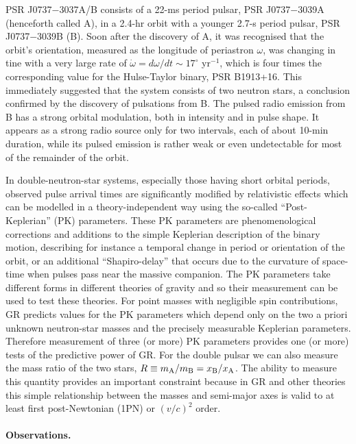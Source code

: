 \documentclass[12pt,psfig]{article}
\begin{document}
PSR J0737$-$3037A/B consists of a 22-ms period pulsar, PSR J0737$-$3039A
(henceforth called A), in a 2.4-hr orbit with a younger 2.7-s period pulsar,
PSR J0737$-$3039B (B).  Soon after the discovery of A\cite{bdp+03}, it was
recognised that the orbit's orientation, measured as the longitude of
periastron $\omega$, was changing in tine with a very large rate of
$\dot{\omega} =d\omega/dt \sim 17^\circ$ yr$^{-1}$, which is four times the
corresponding value for the Hulse-Taylor binary, PSR B1913+16\cite{tw89}. This
immediately suggested that the system consists of two neutron stars, a
conclusion confirmed by the discovery of pulsations from B\cite{lbk+04}. The
pulsed radio emission from B has a strong orbital modulation, both in
intensity and in pulse shape. It appears as a strong radio source only for two
intervals, each of about 10-min duration, while its pulsed emission is rather
weak or even undetectable for most of the remainder of the
orbit\cite{lbk+04,bpm+05}.


In double-neutron-star systems, especially those having short orbital periods,
observed pulse arrival times are significantly modified by relativistic
effects which can be modelled in a theory-independent way using the so-called
``Post-Keplerian'' (PK) parameters\cite{dd86}.  These PK parameters are
phenomenological corrections and additions to the simple Keplerian description
of the binary motion, describing for instance a temporal change in period or
orientation of the orbit, or an additional ``Shapiro-delay'' that occurs due
to the curvature of space-time when pulses pass near the massive companion.
The PK parameters take different forms in different theories of gravity and so
their measurement can be used to test these theories\cite{dt92,wil01}. For
point masses with negligible spin contributions, GR predicts values for the PK
parameters which depend only on the two a priori unknown neutron-star masses
and the precisely measurable Keplerian parameters. Therefore measurement of
three (or more) PK parameters provides one (or more) tests of the predictive
power of GR. For the double pulsar we can also measure the mass ratio of the
two stars, $R \equiv m_{\rm{A}}/m_{\rm{B}} = x_{\rm{B}}/x_{\rm{A}}$. The
ability to measure this quantity provides an important constraint because in
GR and other theories this simple relationship between the masses and
semi-major axes is valid to at least first post-Newtonian (1PN) or $(v/c)^2$
order\cite{ds88,dt92}.

\paragraph*{Observations.}
\end{document}
